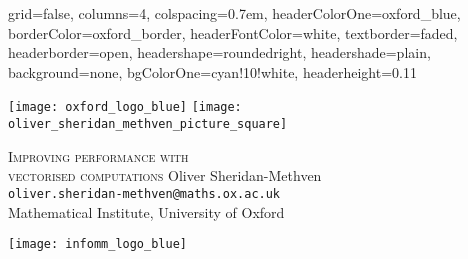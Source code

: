 \documentclass[a0paper,portrait,fontscale=0.40]{baposter}
\begin{document}
\begin{poster}
  {
    grid=false,
    columns=4,
    colspacing=0.7em,
    headerColorOne=oxford_blue,
    borderColor=oxford_border,
    headerFontColor=white,
    textborder=faded,
    headerborder=open,
    headershape=roundedright,
    headershade=plain,
    background=none,
    bgColorOne=cyan!10!white,
    headerheight=0.11\textheight
  }
  {
	\begin{minipage}{0.25\linewidth}
		\texttt{[image: oxford\_logo\_blue]}
		\hfill
		\texttt{[image: oliver\_sheridan\_methven\_picture\_square]}
	\end{minipage}
  }
  {
  	{\textsc{Improving performance with \\[0.1em] vectorised computations}}
 	}
  {
	\vspace{0.5em}
	{Oliver Sheridan-Methven} \\[0.1em]
	\texttt{oliver.sheridan-methven@maths.ox.ac.uk} \\[0.1em]
	Mathematical Institute, University of Oxford \\
  }
  {
    \begin{minipage}{0.25\linewidth}
      \texttt{[image: infomm\_logo\_blue]}
    \end{minipage}
    
  }


  {

%	

}
\end{poster}
\end{document}
